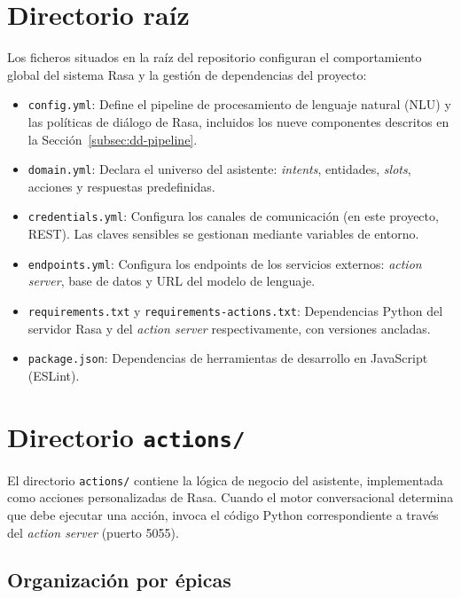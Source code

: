 \section{Directorio raíz}\label{sec:directorio-raiz}

Los ficheros situados en la raíz del repositorio configuran el comportamiento global del sistema Rasa y la gestión de dependencias del proyecto:

\begin{itemize}
    \item \texttt{config.yml}: Define el pipeline de procesamiento de lenguaje natural (NLU) y las políticas de diálogo de Rasa, incluidos los nueve componentes descritos en la Sección~\ref{subsec:dd-pipeline}.
    \item \texttt{domain.yml}: Declara el universo del asistente: \textit{intents}, entidades, \textit{slots}, acciones y respuestas predefinidas.
    \item \texttt{credentials.yml}: Configura los canales de comunicación (en este proyecto, REST). Las claves sensibles se gestionan mediante variables de entorno.
    \item \texttt{endpoints.yml}: Configura los endpoints de los servicios externos: \textit{action server}, base de datos y URL del modelo de lenguaje.
    \item \texttt{requirements.txt} y \texttt{requirements-actions.txt}: Dependencias Python del servidor Rasa y del \textit{action server} respectivamente, con versiones ancladas.
    \item \texttt{package.json}: Dependencias de herramientas de desarrollo en JavaScript (ESLint).
\end{itemize}

\section{Directorio \texttt{actions/}}\label{sec:actions}

El directorio \texttt{actions/} contiene la lógica de negocio del asistente, implementada como acciones personalizadas de Rasa. Cuando el motor conversacional determina que debe ejecutar una acción, invoca el código Python correspondiente a través del \textit{action server} (puerto 5055).

\subsection{Organización por épicas}

